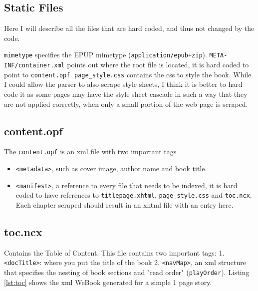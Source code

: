 \documentclass[]{report}   %
\begin{document}
% 
% 
\subsection{Static Files}
Here I will describe all the files that are hard coded, and thus not changed by the code. 

\texttt{mimetype} specifies the EPUP mimetype (\texttt{application/epub+zip}).
\texttt{META-INF/container.xml} points out where the root file is located, it
is hard coded to point to \texttt{content.opf}. \texttt{page\_style.css}
contains the css to style the book. While I could allow the parser to also
scrape style sheets, I think it is better to hard code it as some pages may
have the style sheet cascade in such a way that they are not applied correctly,
when only a small portion of the web page is scraped.

\subsection{content.opf}
The \texttt{content.opf} is an xml file with two important tags
\begin{itemize}
    \item \texttt{<metadata>}, such as cover image, author name and book title.
    \item \texttt{<manifest>}, a reference to every file that needs to be
        indexed, it is hard coded to have references to \texttt{titlepage.xhtml}, \texttt{page\_style.css} and \texttt{toc.ncx}. Each chapter scraped should result in an xhtml file with an entry here.
\end{itemize}

\subsection{toc.ncx}
Contains the Table of Content. This file contains two important tags: 
1. \texttt{<docTitle>}: where you put the title of the book
2. \texttt{<navMap>}, an xml structure that specifies the nesting of book
sections and "read order" (\texttt{playOrder}). Listing \ref{lst:toc} shows
the xml WeBook generated for a simple 1 page story.
\end{document}
